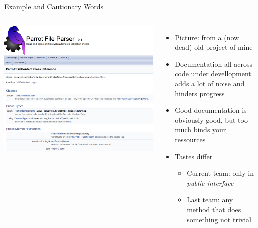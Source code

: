 
\begin{frame}{Example and Cautionary Words}
%
\begin{columns}
\includegraphics[width=\linewidth]{./gfx/15-parrot}
%
\begin{itemize}
\item Picture: from a (now dead) old project of mine
	\pause
\item Documentation all across code under devellopment adds a lot of noise and hinders progress
\item Good documentation is obviously good, but too much binds your ressources
	\pause
\item Tastes differ
	\begin{itemize}
	\item Current team: only in \emph{public interface}
	\item Last team: any method that does something not trivial
	\end{itemize}
\end{itemize}
\end{columns}

%
\end{frame}


